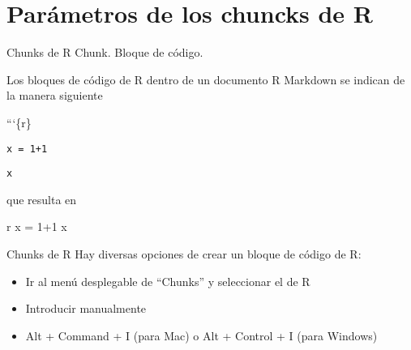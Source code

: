 \documentclass[
  ignorenonframetext,
]{beamer}
\newenvironment{Shaded}{\begin{snugshade}}{\end{snugshade}}
\newcommand{\NormalTok}[1]{#1}
\providecommand{\tightlist}{%
  \setlength{\itemsep}{0pt}\setlength{\parskip}{0pt}}
\begin{document}
\section{Parámetros de los chuncks de
R}\label{paruxe1metros-de-los-chuncks-de-r}

\begin{frame}[fragile]{Chunks de R}
\label{chunks-de-r}
Chunk. Bloque de código.

Los bloques de código de R dentro de un documento R Markdown se indican
de la manera siguiente

```\{r\}

\texttt{x\ =\ 1+1}

\texttt{x}

\begin{Shaded}
\begin{Highlighting}[]

\NormalTok{que resulta en}


\NormalTok{\textasciigrave{}\textasciigrave{}\textasciigrave{} r}
\NormalTok{x = 1+1}
\NormalTok{x}
\end{Highlighting}
\end{Shaded}
\end{frame}

\begin{frame}{Chunks de R}
\label{chunks-de-r-1}
Hay diversas opciones de crear un bloque de código de R:

\begin{itemize}
\tightlist
\item
  Ir al menú desplegable de ``Chunks'' y seleccionar el de R
\item
  Introducir manualmente
\item
  Alt + Command + I (para Mac) o Alt + Control + I (para Windows)
\end{itemize}
\end{frame}
\end{document}

